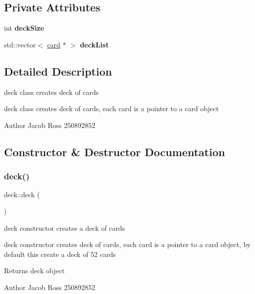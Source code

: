 \subsection*{Private Attributes}
\begin{DoxyCompactItemize}
\item 
\mbox{\label{classdeck_ab69b4ad21bf7c7798f14cd0524db4905}} 
int {\bfseries deck\+Size}
\item 
\mbox{\label{classdeck_a98fd9ff7d975e2a880c07bf38cbd0f24}} 
std\+::vector$<$ \hyperlink{classcard}{card} $\ast$ $>$ {\bfseries deck\+List}
\end{DoxyCompactItemize}


\subsection{Detailed Description}
deck class creates deck of cards 

deck class creates deck of cards, each card is a pointer to a card object \begin{DoxyAuthor}{Author}
Jacob Ross 250892852 
\end{DoxyAuthor}


\subsection{Constructor \& Destructor Documentation}
\mbox{\label{classdeck_a2ff8465ba7b13201bdf650fe461b442e}} 
\subsubsection{\texorpdfstring{deck()}{deck()}}
{\footnotesize\ttfamily deck\+::deck (\begin{DoxyParamCaption}{ }\end{DoxyParamCaption})}



deck constructor creates a deck of cards 

deck constructor creates deck of cards, each card is a pointer to a card object, by default this create a deck of 52 cards \begin{DoxyReturn}{Returns}
deck object 
\end{DoxyReturn}
\begin{DoxyAuthor}{Author}
Jacob Ross 250892852 
\end{DoxyAuthor}


